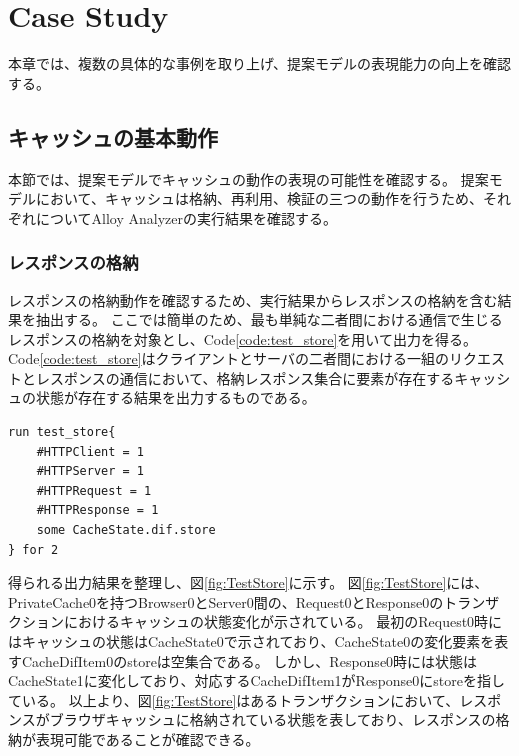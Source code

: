 \documentclass[journal]{IEEEtran}
\begin{document}
\section{Case Study}
本章では、複数の具体的な事例を取り上げ、提案モデルの表現能力の向上を確認する。

\subsection{キャッシュの基本動作}
本節では、提案モデルでキャッシュの動作の表現の可能性を確認する。
提案モデルにおいて、キャッシュは格納、再利用、検証の三つの動作を行うため、それぞれについてAlloy Analyzerの実行結果を確認する。

\subsubsection{レスポンスの格納}
レスポンスの格納動作を確認するため、実行結果からレスポンスの格納を含む結果を抽出する。
ここでは簡単のため、最も単純な二者間における通信で生じるレスポンスの格納を対象とし、Code\ref{code:test_store}を用いて出力を得る。
Code\ref{code:test_store}はクライアントとサーバの二者間における一組のリクエストとレスポンスの通信において、格納レスポンス集合に要素が存在するキャッシュの状態が存在する結果を出力するものである。

\begin{lstlisting}[caption=レスポンスの格納, label=code:test_store]
run test_store{
	#HTTPClient = 1
	#HTTPServer = 1
	#HTTPRequest = 1
	#HTTPResponse = 1
	some CacheState.dif.store
} for 2
\end{lstlisting}

得られる出力結果を整理し、図\ref{fig:TestStore}に示す。
図\ref{fig:TestStore}には、PrivateCache0を持つBrowser0とServer0間の、Request0とResponse0のトランザクションにおけるキャッシュの状態変化が示されている。
最初のRequest0時にはキャッシュの状態はCacheState0で示されており、CacheState0の変化要素を表すCacheDifItem0のstoreは空集合である。
しかし、Response0時には状態はCacheState1に変化しており、対応するCacheDifItem1がResponse0にstoreを指している。
以上より、図\ref{fig:TestStore}はあるトランザクションにおいて、レスポンスがブラウザキャッシュに格納されている状態を表しており、レスポンスの格納が表現可能であることが確認できる。
\end{document}
